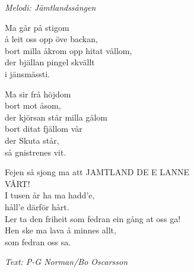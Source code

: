 {\footnotesize\textit{Melodi: Jämtlandssången}}\par
\vspace{10pt}
Ma går på stigom\\
å leit oss opp öve backan,\\
bort milla åkrom opp hitat vållom,\\
der bjällan pingel skvällt\\
i jänsmässti.\par
\vspace{10pt}
Ma sir frå höjdom\\
bort mot åsom,\\
der kjörsan står milla gålom\\
bort ditat fjällom vår\\
der Skuta står,\\
så gnistrenes vit.\par
\vspace{10pt}
\revrpt Fejen så sjong ma att JAMTLAND DE E LANNE\\
VÅRT!\\
I tusen år ha ma hadd'e,\\
håll'e därför hårt.\\
Ler ta den friheit som fedran ein gång at oss ga!\\
Hen ske ma lava å minnes allt,\\
som fedran oss sa.\rpt\par
\vspace{10pt}
{\footnotesize\textit{Text: P-G Norman/Bo Oscarsson}}
